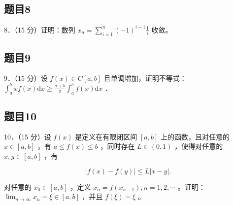 \documentclass{article}
\begin{document}
\subsection{题目8}
8．（15 分）证明：数列 \(x_{n}=\sum_{i=1}^{n}(-1)^{i-1} \frac{1}{i}\) 收敛。

\subsection{题目9}
9．（15 分）设 \(f(x) \in C[a, b]\) 且单调增加，证明不等式： \(\int_{a}^{b} x f(x) \mathrm{d} x \geq \frac{a+b}{2} \int_{a}^{b} f(x) \mathrm{d} x\) ．

\subsection{题目10}
10．（15 分）设 \(f(x)\) 是定义在有限闭区间 \([a, b]\) 上的函数，且对任意的 \(x \in[a, b]\) ，有 \(a \leq f(x) \leq b\) ，同时存在 \(L \in(0,1)\) ，使得对任意的 \(x, y \in[a, b]\) ，有

\[
|f(x)-f(y)| \leq L|x-y| .
\]

对任意的 \(x_{0} \in[a, b]\) ，定义 \(x_{n}=f\left(x_{n-1}\right), n=1,2, \cdots\) 。证明： \(\lim _{n \rightarrow \infty} x_{n}=\xi \in[a, b]\) ，并且 \(f(\xi)=\xi\) 。
\end{document}
